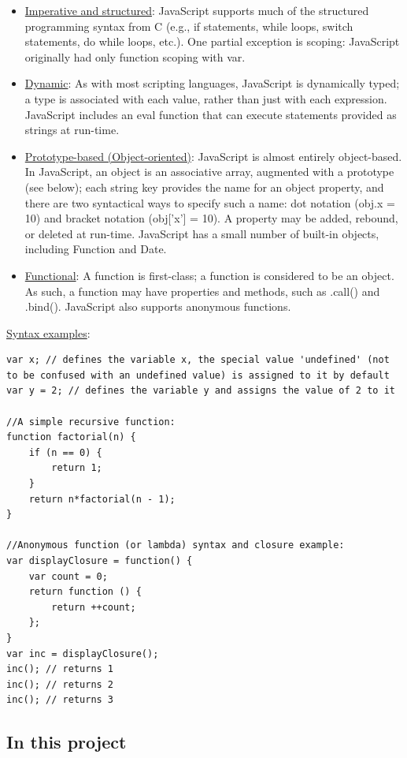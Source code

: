 \documentclass[a4paper, 12pt]{book}
\begin{document}
\begin{itemize}  
\item \underline{Imperative and structured}: 
JavaScript supports much of the structured programming syntax from C (e.g., if statements, while loops, switch statements, do while loops, etc.). One partial exception is scoping: JavaScript originally had only function scoping with var.
\item \underline{Dynamic}:
As with most scripting languages, JavaScript is dynamically typed; a type is associated with each value, rather than just with each expression. JavaScript includes an eval function that can execute statements provided as strings at run-time.
\item \underline{Prototype-based (Object-oriented)}:
JavaScript is almost entirely object-based. In JavaScript, an object is an associative array, augmented with a prototype (see below); each string key provides the name for an object property, and there are two syntactical ways to specify such a name: dot notation (obj.x = 10) and bracket notation (obj['x'] = 10). A property may be added, rebound, or deleted at run-time. JavaScript has a small number of built-in objects, including Function and Date.
\item \underline{Functional}:
A function is first-class; a function is considered to be an object. As such, a function may have properties and methods, such as .call() and .bind(). JavaScript also supports anonymous functions.
\end{itemize}
\underline{Syntax examples}:
\begin{lstlisting}[frame=single]
var x; // defines the variable x, the special value 'undefined' (not to be confused with an undefined value) is assigned to it by default
var y = 2; // defines the variable y and assigns the value of 2 to it

//A simple recursive function:
function factorial(n) {
    if (n == 0) {
        return 1;
    }
    return n*factorial(n - 1);
}

//Anonymous function (or lambda) syntax and closure example:
var displayClosure = function() {
    var count = 0;
    return function () {
        return ++count;
    };
}
var inc = displayClosure();
inc(); // returns 1
inc(); // returns 2
inc(); // returns 3
\end{lstlisting}
\subsection{In this project}
\end{document}
